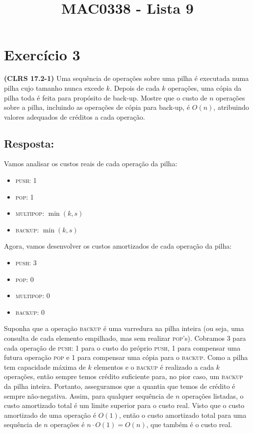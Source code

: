 \documentclass{article}
\title{MAC0338 - Lista 9}
\author{}
\date{}
\begin{document}
\maketitle

\section*{Exercício 3}
\textbf{(CLRS 17.2-1)} Uma sequência de operações sobre uma pilha é executada numa pilha cujo tamanho nunca excede $k$. Depois de cada $k$ operações, uma cópia da pilha toda é feita para propósito de back-up. Mostre que o custo de $n$ operações sobre a pilha, incluindo as operações de cópia para back-up, é $O(n)$, atribuindo valores adequados de créditos a cada operação.

\bigskip

\subsection*{Resposta:}
Vamos analisar os custos reais de cada operação da pilha:
\begin{multicols}{4}
\begin{itemize}
  \item \textsc{push}: 1
  \item \textsc{pop}: 1
  \item \textsc{multipop}: $\min(k,s)$
  \item \textsc{backup}: $\min(k,s)$
\end{itemize}
\end{multicols}

Agora, vamos desenvolver os custos amortizados de cada operação da pilha:
\begin{multicols}{4}
\begin{itemize}
  \item \textsc{push}: 3
  \item \textsc{pop}: 0
  \item \textsc{multipop}: 0
  \item \textsc{backup}: 0
\end{itemize}
\end{multicols}
Suponha que a operação \textsc{backup} é uma varredura na pilha inteira (ou seja, uma consulta de cada elemento empilhado, mas sem realizar \textsc{pop}'s).
Cobramos 3 para cada operação de \textsc{push}: 1 para o custo do próprio \textsc{push}, 1 para compensar uma futura operação \textsc{pop} e 1 para compensar uma  cópia para o \textsc{backup}.
Como a pilha tem capacidade máxima de $k$ elementos e o \textsc{backup} é realizado a cada $k$ operações, então sempre temos crédito suficiente para, no pior caso, um \textsc{backup} da pilha inteira.
Portanto, asseguramos que a quantia que temos de crédito é sempre não-negativa.
Assim, para qualquer sequência de $n$ operações listadas, o custo amortizado total é um limite superior para o custo real.
Visto que o custo amortizado de uma operação é $O(1)$, então o custo amortizado total para uma sequência de $n$ operações é $n \cdot O(1) = O(n)$, que também é o custo real.
\end{document}
